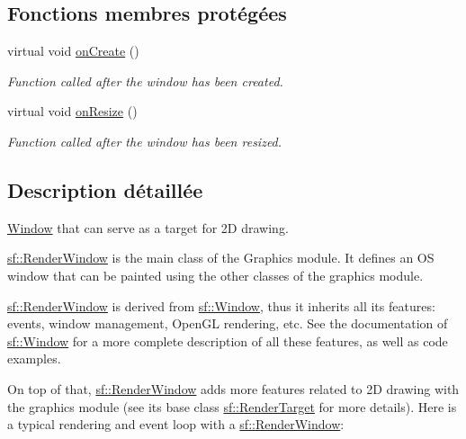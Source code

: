 \subsection*{Fonctions membres protégées}
\begin{DoxyCompactItemize}
\item 
virtual void \hyperlink{classsf_1_1RenderWindow_a5bef0040b0fa87bed9fbd459c980d53a}{on\+Create} ()
\begin{DoxyCompactList}\small\item\em Function called after the window has been created. \end{DoxyCompactList}\item 
virtual void \hyperlink{classsf_1_1RenderWindow_a5c85fe482313562d33ffd24a194b6fef}{on\+Resize} ()
\begin{DoxyCompactList}\small\item\em Function called after the window has been resized. \end{DoxyCompactList}\end{DoxyCompactItemize}


\subsection{Description détaillée}
\hyperlink{classsf_1_1Window}{Window} that can serve as a target for 2D drawing. 

\hyperlink{classsf_1_1RenderWindow}{sf\+::\+Render\+Window} is the main class of the Graphics module. It defines an OS window that can be painted using the other classes of the graphics module.

\hyperlink{classsf_1_1RenderWindow}{sf\+::\+Render\+Window} is derived from \hyperlink{classsf_1_1Window}{sf\+::\+Window}, thus it inherits all its features\+: events, window management, Open\+GL rendering, etc. See the documentation of \hyperlink{classsf_1_1Window}{sf\+::\+Window} for a more complete description of all these features, as well as code examples.

On top of that, \hyperlink{classsf_1_1RenderWindow}{sf\+::\+Render\+Window} adds more features related to 2D drawing with the graphics module (see its base class \hyperlink{classsf_1_1RenderTarget}{sf\+::\+Render\+Target} for more details). Here is a typical rendering and event loop with a \hyperlink{classsf_1_1RenderWindow}{sf\+::\+Render\+Window}\+:


